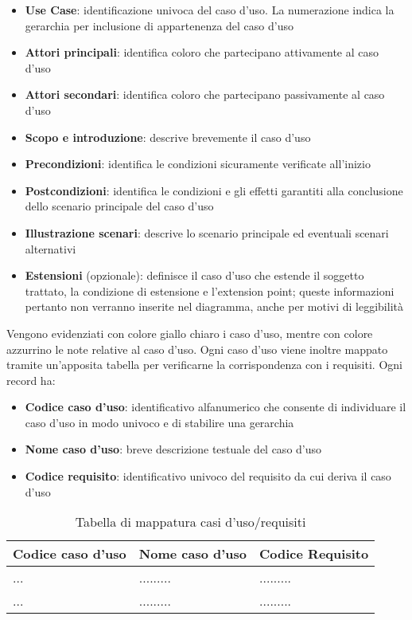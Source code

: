 \documentclass[a4paper,11pt]{article}
\begin{document}
\begin{itemize}
\item \textbf{Use Case}: identificazione univoca del caso d'uso. La numerazione indica la gerarchia per inclusione di appartenenza del caso d'uso
\item \textbf{Attori principali}: identifica coloro che partecipano attivamente al caso d'uso
\item \textbf{Attori secondari}: identifica coloro che partecipano passivamente al caso d'uso
\item \textbf{Scopo e introduzione}: descrive brevemente il caso d'uso
\item \textbf{Precondizioni}: identifica le condizioni sicuramente verificate all'inizio
\item \textbf{Postcondizioni}: identifica le condizioni e gli effetti garantiti alla conclusione dello scenario principale del caso d'uso
\item \textbf{Illustrazione scenari}: descrive lo scenario principale ed eventuali scenari alternativi
\item \textbf{Estensioni} (opzionale): definisce il caso d'uso che estende il soggetto trattato, la condizione di estensione e l'extension point; queste informazioni pertanto non verranno inserite nel diagramma, anche per motivi di leggibilit\`a
\end{itemize}
Vengono evidenziati con colore giallo chiaro i caso d'uso, mentre con colore azzurrino le note relative al caso d'uso. Ogni caso d'uso viene inoltre mappato tramite un'apposita tabella per verificarne la corrispondenza con i requisiti. Ogni record ha:
\begin{itemize}
\item \textbf{Codice caso d'uso}: identificativo alfanumerico che consente di individuare il caso d'uso in modo univoco e di stabilire una gerarchia
\item \textbf{Nome caso d'uso}: breve descrizione testuale del caso d'uso
\item \textbf{Codice requisito}: identificativo univoco del requisito da cui deriva il caso d'uso
\end{itemize}
\begin{table}[h!]
\begin{tabularx}{\textwidth}{XXX}
Codice caso d'uso & Nome caso d'uso & Codice Requisito \\
\toprule
... & ......... & ......... \\
\midrule
... & ......... & ......... \\
\midrule
\end{tabularx}
\caption{Tabella di mappatura casi d'uso/requisiti}
\end{table}
\end{document}
